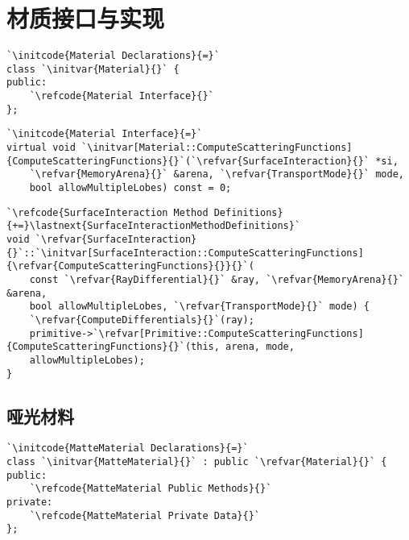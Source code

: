 \section{材质接口与实现}\label{sec:材质接口与实现}

\begin{lstlisting}
`\initcode{Material Declarations}{=}`
class `\initvar{Material}{}` {
public:
    `\refcode{Material Interface}{}`
};
\end{lstlisting}

\begin{lstlisting}
`\initcode{Material Interface}{=}`
virtual void `\initvar[Material::ComputeScatteringFunctions]{ComputeScatteringFunctions}{}`(`\refvar{SurfaceInteraction}{}` *si,
    `\refvar{MemoryArena}{}` &arena, `\refvar{TransportMode}{}` mode,
    bool allowMultipleLobes) const = 0;
\end{lstlisting}

\begin{lstlisting}
`\refcode{SurfaceInteraction Method Definitions}{+=}\lastnext{SurfaceInteractionMethodDefinitions}`
void `\refvar{SurfaceInteraction}{}`::`\initvar[SurfaceInteraction::ComputeScatteringFunctions]{\refvar{ComputeScatteringFunctions}{}}{}`(
    const `\refvar{RayDifferential}{}` &ray, `\refvar{MemoryArena}{}` &arena,
    bool allowMultipleLobes, `\refvar{TransportMode}{}` mode) {
    `\refvar{ComputeDifferentials}{}`(ray);
    primitive->`\refvar[Primitive::ComputeScatteringFunctions]{ComputeScatteringFunctions}{}`(this, arena, mode,
    allowMultipleLobes);
}
\end{lstlisting}

\subsection{哑光材料}\label{sub:哑光材料}
\begin{lstlisting}
`\initcode{MatteMaterial Declarations}{=}`
class `\initvar{MatteMaterial}{}` : public `\refvar{Material}{}` {
public:
    `\refcode{MatteMaterial Public Methods}{}`
private:
    `\refcode{MatteMaterial Private Data}{}`
};
\end{lstlisting}